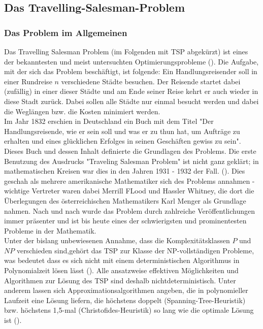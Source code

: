 \documentclass[doktyp=barbeit, sprache=german]{TUBAFarbeiten}
\begin{document}
\subsection{Das Travelling-Salesman-Problem}
\subsubsection{Das Problem im Allgemeinen}
Das Travelling Salesman Problem (im Folgenden mit TSP abgekürzt) ist eines der bekanntesten und meist untersuchten Optimierungsprobleme (\cite{TaschenbuchAlgorithmen}). Die Aufgabe, mit der sich das Problem beschäftigt, ist folgende: Ein Handlungsreisender soll in einer Rundreise \(n\) verschiedene Städte besuchen. Der Reisende startet dabei (zufällig) in einer dieser Städte und am Ende seiner Reise kehrt er auch wieder in diese Stadt zurück. Dabei sollen alle Städte nur einmal besucht werden und dabei die Weglängen bzw. die Kosten minimiert werden.
\\Im Jahr 1832 erschien in Deutschland ein Buch mit dem Titel "Der Handlungsreisende, wie er sein soll und was er zu thun hat, um Aufträge zu erhalten und eines glücklichen Erfolges in seinen Geschäften gewiss zu sein". Dieses Buch und dessen Inhalt definierte die Grundlagen des Problems.  Die erste Benutzung des Ausdrucks "Traveling Salesman Problem" ist nicht ganz geklärt; in mathematischen Kreisen war dies in den Jahren 1931 - 1932 der Fall. (\cite{TSP}). 
Dies geschah als mehrere amerikanische Mathematiker sich des Problems annahmen - wichtige Vertreter waren dabei Merrill FLood und Hassler Whitney, die dort die Überlegungen des österreichischen Mathematikers Karl Menger als Grundlage nahmen. Nach und nach wurde das Problem durch zahlreiche Veröffentlichungen immer präsenter und ist bis heute eines der schwierigsten und prominentesten Probleme in der Mathematik.
\\Unter der bislang unbewiesenen Annahme, dass die Komplexitätsklassen $P$ und $NP$ verschieden sind,gehört das TSP zur Klasse der NP-vollständigen Probleme, was bedeutet dass es sich nicht mit einem deterministischen Algorithmus in Polynomialzeit lösen lässt (\cite{Applegate2007}).  Alle ansatzweise effektiven Möglichkeiten und Algorithmen zur Lösung des TSP sind deshalb nichtdeterministisch. Unter anderem lassen sich Approximationsalgorithmen angeben, die in polynomieller Laufzeit eine Lösung liefern, die höchstens doppelt (Spanning-Tree-Heuristik) bzw. höchstens 1,5-mal (Christofides-Heuristik) so lang wie die optimale Lösung ist (\cite{Groetschel2005}).
\end{document}
